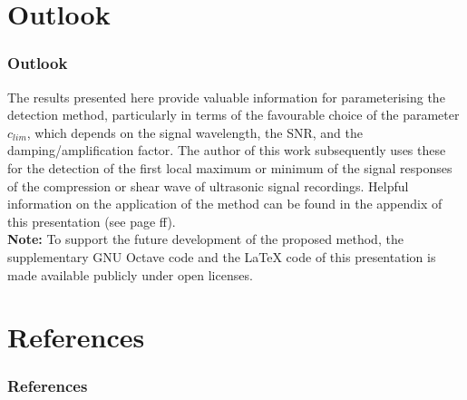 \documentclass[11pt,aspectratio=169]{beamer}
\begin{document}
	\section{Outlook}
	\begin{frame}
		\frametitle{Outlook}
		The results presented here provide valuable information for parameterising the detection method, particularly in terms of the favourable choice of the parameter $c_{lim}$, which depends on the signal wavelength, the SNR, and the damping/amplification factor. The author of this work subsequently uses these for the detection of the first local maximum or minimum of the signal responses of the compression or shear wave of ultrasonic signal recordings\cite{webpaper2,webpaper3}.
		Helpful information on the application of the method can be found in the appendix of this presentation (see page \pageref{sec:appendix}ff).\\
		\vspace*{.5em}
		\textbf{Note:} To support the future development of the proposed method, the supplementary GNU Octave code\autocite{progcode} and the \LaTeX{} code\autocite{texcode} of this presentation is made available publicly under open licenses.
	\end{frame}
	\section*{References}
	\begin{frame}[noframenumbering,shrink=13]
		\frametitle{References}
		\printbibliography
	\end{frame}
	\appendix
\end{document}
